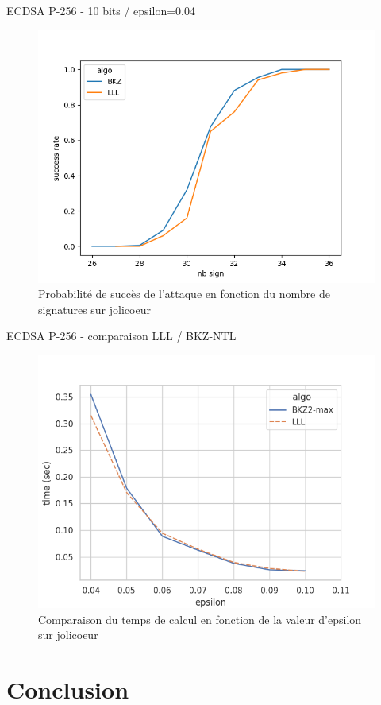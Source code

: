 \documentclass{backend/backend}
\begin{document}
\begin{frame}{ECDSA P-256 - 10 bits / epsilon=0.04}
\vspace*{-0.28cm}
\begin{figure}
    \centering
    \includegraphics[width=0.60\linewidth]{img/courbes/proba_P256_004/P256_lineplot.png}
    \vspace*{-0.20cm}
    \caption{\footnotesize Probabilité de succès de l'attaque en fonction du nombre de signatures sur jolicoeur}
    \label{fig:proba_004_P256_lineplot}
\end{figure}
\end{frame}

\begin{frame}{ECDSA P-256 - comparaison LLL / BKZ-NTL}
\vspace*{-0.28cm}
\begin{figure}
    \centering
    \includegraphics[width=0.60\linewidth]{img/courbes/P-256-jolicoeur/P-256_meant_maxm_epsi_time.png}
    \vspace*{-0.20cm}
    \caption{\footnotesize Comparaison du temps de calcul en fonction de la valeur d'epsilon sur jolicoeur}
    \label{fig:P-256_epsi_time}
\end{figure}
\end{frame}

\section{Conclusion}
\end{document}
